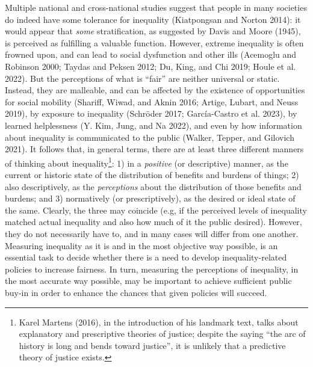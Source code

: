\documentclass[12pt, oneside]{report}
\begin{document}
Multiple national and cross-national studies suggest that people in many
societies do indeed have some tolerance for inequality (Kiatpongsan and
Norton 2014): it would appear that \emph{some} stratification, as
suggested by Davis and Moore (1945), is perceived as fulfilling a
valuable function. However, extreme inequality is often frowned upon,
and can lead to social dysfunction and other ills (Acemoglu and Robinson
2000; Taydas and Peksen 2012; Du, King, and Chi 2019; Houle et al.
2022). But the perceptions of what is ``fair'' are neither universal or
static. Instead, they are malleable, and can be affected by the
existence of opportunities for social mobility (Shariff, Wiwad, and
Aknin 2016; Artige, Lubart, and Neuss 2019), by exposure to inequality
(Schröder 2017; García-Castro et al. 2023), by learned helplessness (Y.
Kim, Jung, and Na 2022), and even by how information about inequality is
communicated to the public (Walker, Tepper, and Gilovich 2021). It
follows that, in general terms, there are at least three different
manners of thinking about inequality\footnote{Karel Martens (2016), in
  the introduction of his landmark text, talks about explanatory and
  prescriptive theories of justice; despite the saying ``the arc of
  history is long and bends toward justice'', it is unlikely that a
  predictive theory of justice exists.}: 1) in a \emph{positive} (or
descriptive) manner, as the current or historic state of the
distribution of benefits and burdens of things; 2) also descriptively,
as the \emph{perceptions} about the distribution of those benefits and
burdens; and 3) normatively (or prescriptively), as the desired or ideal
state of the same. Clearly, the three may coincide (e.g, if the
perceived levels of inequality matched actual inequality and also how
much of it the public desired). However, they do not necessarily have
to, and in many cases will differ from one another. Measuring inequality
as it is and in the most objective way possible, is an essential task to
decide whether there is a need to develop inequality-related policies to
increase fairness. In turn, measuring the perceptions of inequality, in
the most accurate way possible, may be important to achieve sufficient
public buy-in in order to enhance the chances that given policies will
succeed.
\end{document}
